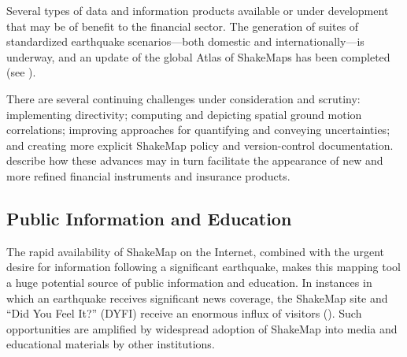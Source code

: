 \documentclass[letterpaper,10pt,english]{sphinxmanual}
\begin{document}
Several types of data and information products available or under development
that may be of benefit to the financial sector. The generation of suites of
standardized earthquake scenarios---both domestic and internationally---is underway,
and an update of the global Atlas of ShakeMaps has been completed (see
{\hyperref[shakemap_archives:sec\string-shakemap\string-archives]{}}).

There are several continuing challenges under consideration
and scrutiny: implementing directivity; computing and depicting spatial ground
motion correlations; improving approaches for quantifying and conveying
uncertainties; and creating more explicit ShakeMap policy and version-control
documentation. {\hyperref[references:wald2016]{}} describe how these
advances may in turn facilitate the appearance of new and more refined financial
instruments and insurance products.


\subsection{Public Information and Education}
\label{shakemap_applications:public-information-and-education}
The rapid availability of ShakeMap on the Internet, combined with the urgent
desire for information following a significant earthquake, makes this mapping
tool a huge potential source of public information and education. In instances
in which an earthquake receives significant news coverage, the ShakeMap site
and “Did You Feel It?” (DYFI) receive an enormous influx of
visitors ({\hyperref[references:wald2011c]{}}). Such opportunities are
amplified by widespread adoption of ShakeMap into media and educational
materials by other institutions.
\end{document}
